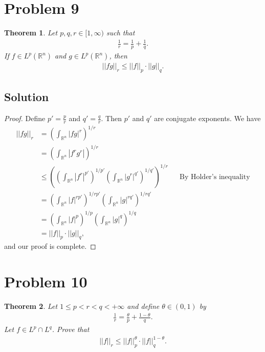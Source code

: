\documentclass[10pt,a4paper]{article}
\theoremstyle{theorem}
\newtheorem{theorem}{Theorem}
\theoremstyle{definition}
\begin{document}
\section*{Problem 9}
\begin{theorem}
Let $p,q,r \in [1, \infty)$ such that
\begin{align*}
\frac{1}{r} = \frac{1}{p} + \frac{1}{q}.
\end{align*}
If $f \in L^p(\mathbb{R}^n)$ and $g \in L^p(\mathbb{R}^n)$, then
\begin{align*}
||fg||_r \leq ||f||_p \cdot ||g||_q.
\end{align*}
\end{theorem}

\subsection*{Solution}
\begin{proof}
Define $p' = \frac{p}{r}$ and $q' = \frac{q}{r}$. Then $p'$ and $q'$ are conjugate exponents. We have
\begin{align*}
||fg||_r &= \left(\int_{\mathbb{R}^n} |fg|^r \right)^{1/r}\\
&= \left(\int_{\mathbb{R}^n} |f^r g^r| \right)^{1/r}\\
&\leq \left(\left(\int_{\mathbb{R}^n} |f^r|^{p'} \right)^{1/p'} \left(\int_{\mathbb{R}^n} |g^r|^{q'} \right)^{1/q'} \right)^{1/r} &&\text{By Holder's inequality}\\
&= \left(\int_{\mathbb{R}^n} |f|^{rp'} \right)^{1/rp'} \left(\int_{\mathbb{R}^n} |g|^{rq'} \right)^{1/rq'}\\
&= \left(\int_{\mathbb{R}^n} |f|^{p} \right)^{1/p} \left(\int_{\mathbb{R}^n} |g|^{q} \right)^{1/q}\\
&= ||f||_p \cdot ||g||_q,
\end{align*}
and our proof is complete.
\end{proof}

\section*{Problem 10}
\begin{theorem}
Let $1 \leq p < r < q < + \infty$ and define $\theta \in (0, 1)$ by 
\begin{align*}
\frac{1}{r} = \frac{\theta}{p} + \frac{1 - \theta}{q}.
\end{align*}
Let $f \in L^p \cap L^q$. Prove that 
\begin{align*}
||f||_r \leq ||f||_p^\theta \cdot ||f||_q^{1 - \theta}.
\end{align*}
\end{theorem}
\end{document}

